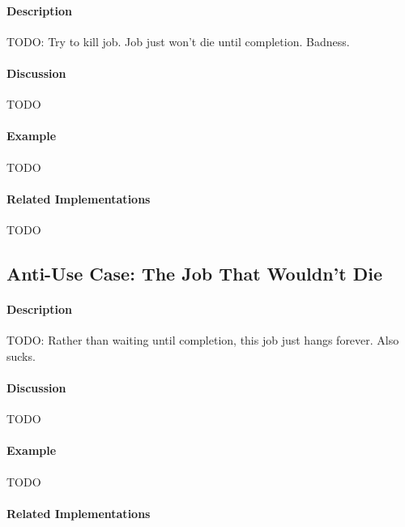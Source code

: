 \paragraph{Description}

{\Large TODO:} Try to kill job.  Job just won't die until completion.  Badness.

\paragraph{Discussion}

{\Large TODO}

\paragraph{Example}

{\Large TODO}

\paragraph{Related Implementations}

{\Large TODO}

\subsection{Anti-Use Case: The Job That Wouldn't Die}

\paragraph{Description}

{\Large TODO:} Rather than waiting until completion, this job just hangs forever.  Also sucks.

\paragraph{Discussion}

{\Large TODO}

\paragraph{Example}

{\Large TODO}

\paragraph{Related Implementations}

